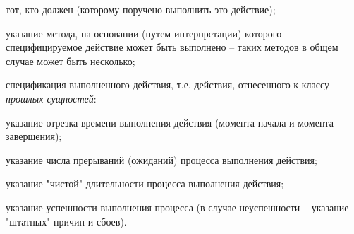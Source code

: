 \begin{SCn}
{\begin{scnitemize}
\begin{scnitemizeii}
			\item тот, кто должен (которому поручено выполнить это действие);
		\end{scnitemizeii}
		\item указание метода, на основании (путем интерпретации) которого специфицируемое действие может быть выполнено -- таких методов в общем случае может быть несколько;
		\item спецификация выполненного действия, т.е. действия, отнесенного к классу \textit{прошлых сущностей}:
		\begin{scnitemizeii}
			\item указание отрезка времени выполнения действия (момента начала и момента завершения);
			\item указание числа прерываний (ожиданий) процесса выполнения действия;
			\item указание "чистой"{} длительности процесса выполнения действия;
			\item указание успешности выполнения процесса (в случае неуспешности -- указание "штатных"{} причин и сбоев).
		\end{scnitemizeii}
\end{scnitemize}}


\end{SCn}
